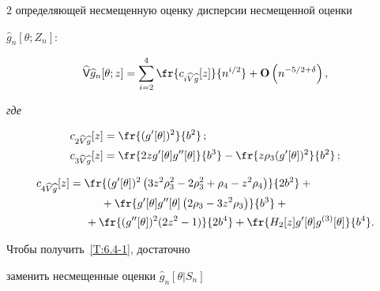 \begin{multicols}{2}
{ определяющей несмещенную оценку дисперсии несмещенной оценки}


 $\widehat{g}_n[\theta;Z_n]$:


 \begin{equation}


 \widehat{\Vp} \widehat{g}_n[\theta;z]=


  \sum_{i=2}^4 \fr{c_{i\widehat{V}\widehat{g}}[z]}{n^{i/2}}+


  \Op\left( n^{-5/2+\delta}\right),


 \label{T:6.4-1}


 \end{equation}


\textit{где}


 \begin{align*}


  c_{2\widehat{V}\widehat{g}}[z]


&   =\fr{(g'[\theta])^2}{b^2}\,;\\


   c_{3\widehat{V}\widehat{g}}[z]&    =


   \fr{2z g'[\theta] g''[\theta]}{b^3}-\fr{z \rho_3 (g'[\theta])^2}{b^2}\,;


\end{align*}


 \begin{align*}


  c_{4\widehat{V}\widehat{g}}[z]


   &=\fr{(g'[\theta])^2


   \left(3 z^2 \rho_3^2-2\rho_3^2+\rho_4 -  z^2 \rho_4 \right)}{2 b^2}


  +{}\\


  &\hspace*{10mm}{}+\fr{g'[\theta] g''[\theta]\left(2 \rho_3 -3 z^2 \rho_3


  \right)}{b^3}+{}


\\


& \hspace*{5mm}{} +\fr{(g''[\theta])^2 (2z^2-1)}{2 b^4}


   +\fr{H_2[z] g'[\theta] g^{(3)}[\theta]}{b^4}.


 \end{align*}





  \Do Чтобы получить~\eqref{T:6.4-1}, достаточно


  заменить несмещенные оценки $\widehat{g}_n[\theta|S_n]$ 



\end{multicols}
